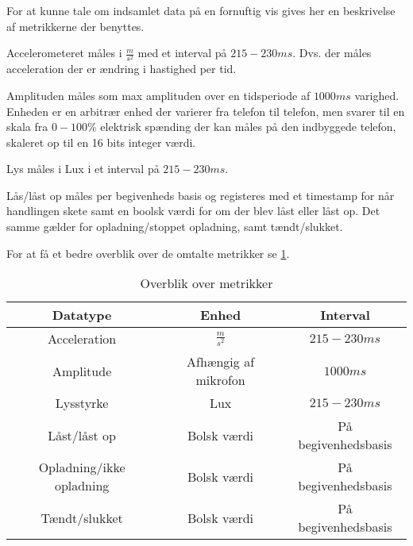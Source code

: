 For at kunne tale om indsamlet data på en fornuftig vis gives her en beskrivelse af metrikkerne der benyttes.

Accelerometeret måles i $\frac{m}{s^2}$ med et interval på $215-230 ms$.
Dvs. der måles acceleration der er ændring i hastighed per tid.

Amplituden måles som max amplituden over en tidsperiode af $1000ms$ varighed.
Enheden er en arbitrær enhed der varierer fra telefon til telefon, men svarer til en skala fra $0-100\%$ elektrisk spænding der kan måles på den indbyggede telefon, skaleret op til en 16 bits integer værdi.

Lys måles i Lux i et interval på $215-230 ms$.

Lås/låst op måles per begivenheds basis og registeres med et timestamp for når handlingen skete samt en boolsk værdi for om der blev låst eller låst op.
Det samme gælder for opladning/stoppet opladning, samt tændt/slukket.

For at få et bedre overblik over de omtalte metrikker se \cref{tab:metrikker}.

\begin{table}
\begin{tabular}{|c|c|c|}
	\hline Datatype & Enhed & Interval \\ 
	\hline Acceleration & $\frac{m}{s^2}$ & $215-230ms$ \\ 
	\hline Amplitude & Afhængig af mikrofon & $1000ms$ \\ 
	\hline Lysstyrke & Lux & $215-230ms$ \\ 
	\hline Låst/låst op & Bolsk værdi & På begivenhedsbasis \\ 
	\hline Opladning/ikke opladning & Bolsk værdi & På begivenhedsbasis \\ 
	\hline Tændt/slukket & Bolsk værdi & På begivenhedsbasis \\ 
	\hline 
\end{tabular}
\caption{Overblik over metrikker}\label{tab:metrikker} 
\end{table}
